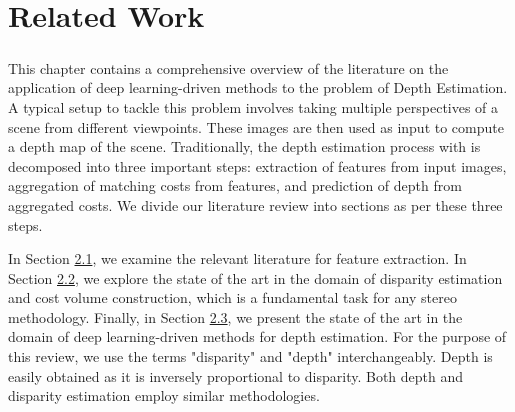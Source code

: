 \chapter{Related Work}\label{chap:relatedwork}

\paragraph{} This chapter contains a comprehensive overview of the literature on the application of deep learning-driven {\mvs} methods to the problem of Depth Estimation. A typical setup to tackle this problem involves taking multiple perspectives of a scene from different viewpoints. These images are then used as input to compute a depth map of the scene. Traditionally, the depth estimation process with {\mvs} is decomposed into three important steps: extraction of features from input images, aggregation of matching costs from features, and prediction of depth from aggregated costs. We divide our literature review into sections as per these three steps. \par 
In Section \hyperref[sec:relwork-featex]{2.1}, we examine the relevant literature for feature extraction. In Section \hyperref[sec:relwork-dispes]{2.2}, we explore the state of the art in the domain of disparity estimation and cost volume construction, which is a fundamental task for any stereo methodology. Finally, in Section \hyperref[sec:relwork-mvs]{2.3}, we present the state of the art in the domain of deep learning-driven {\mvs} methods for depth estimation. For the purpose of this review, we use the terms "disparity" and "depth" interchangeably. Depth is easily obtained as it is inversely proportional to disparity. Both depth and disparity estimation employ similar methodologies.

